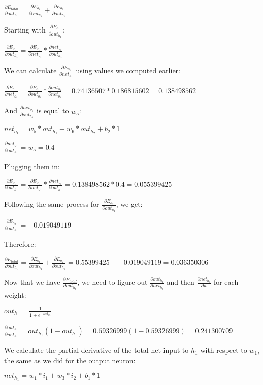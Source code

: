 \documentclass[a4paper]{article}
\begin{document}
$\frac{\partial E_{total}}{\partial out_{h_1}} = \frac{\partial E_{o_1}}{\partial out_{h_1}} + \frac{\partial E_{o_2}}{\partial out_{h_1}}$

\bigskip
Starting with $\frac{\partial E_{o_1}}{\partial out_{h_1}}$:

$\frac{\partial E_{o_1}}{\partial out_{h_1}} = \frac{\partial E_{o_1}}{\partial net_{o_1}} * \frac{\partial net_{o_1}}{\partial out_{h_1}}$

We can calculate $\frac{\partial E_{o_1}}{\partial net_{h_1}}$ using values we computed earlier:

$\frac{\partial E_{o_1}}{\partial net_{o_1}} = \frac{\partial E_{o_1}}{\partial out_{o_1}}*\frac{\partial out_{o_1}}{\partial net_{o_1}}=0.74136507*0.186815602=0.138498562$ 

And $\frac{\partial net_{o_1}}{\partial out_{h_1}}$ is equal to $w_5$:

$net_{o_1}=w_5*out_{h_1}+w_6*out_{h_2}+b_2*1$

$\frac{\partial net_{o_1}}{\partial out_{h_1}} = w_5 = 0.4$

\bigskip
Plugging them in:

$\frac{\partial E_{o_1}}{\partial out_{h_1}} = \frac{\partial E_{o_1}}{\partial net_{o_1}} * \frac{\partial net_{o_1}}{\partial out_{h_1}}=0.138498562*0.4=0.055399425$

Following the same process for $\frac{\partial E_{o_2}}{\partial out_{h_1}}$, we get:

$\frac{\partial E_{o_2}}{\partial out_{h_1}}=-0.019049119$

Therefore:

$\frac{\partial E_{total}}{\partial out_{h_1}}=\frac{\partial E_{o_1}}{\partial out_{h_1}}+\frac{\partial E_{o_2}}{\partial out_{h_1}} = 0.55399425+-0.019049119=0.036350306$

\bigskip
Now that we have $\frac{\partial E_{total}}{\partial out_{h_1}}$, we need to figure out $\frac{\partial out_{h_1}}{\partial net_{h_1}}$ and then $\frac{\partial net_{h_1}}{\partial w}$ for each weight:

$out_{h_1} = \frac{1}{1+e^{-net_{h_1}}}$

$\frac{\partial out_{h_1}}{\partial net_{h_1}} = out_{h_1}(1-out_{h_1})=0.59326999(1-0.59326999)=0.241300709$

\bigskip
We calculate the partial derivative of the total net input to $h_1$ with respect to $w_1$, the same as we did for the output neuron:

$net_{h_1} = w_1*i_1+w_3*i_2+b_1*1$
\end{document}
